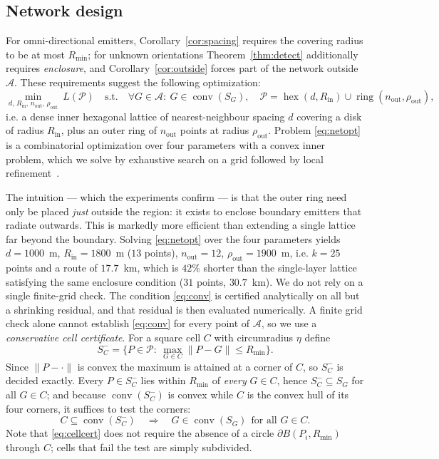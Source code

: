 \documentclass[journal,10pt]{IEEEtran}
\theoremstyle{definition}
\newcommand{\conv}{\operatorname{conv}}
\newcommand{\Rmin}{R_{\min}}
\newcommand{\bA}{\mathcal{A}}
\newcommand{\bP}{\mathcal{P}}
\begin{document}
\subsection{Network design}
\label{sec:network}

For omni-directional emitters, Corollary~\ref{cor:spacing} requires the covering radius to be at
most $\Rmin$; for unknown orientations Theorem~\ref{thm:detect} additionally requires
\emph{enclosure}, and Corollary~\ref{cor:outside} forces part of the network outside $\bA$. These
requirements suggest the following optimization:
\begin{equation}
\min_{d,\,R_{\mathrm{in}},\,n_{\mathrm{out}},\,\rho_{\mathrm{out}}}\ L(\bP)
\quad\text{s.t.}\quad \forall G\in\bA:\ G\in\conv(S_G),
\quad
\bP=\operatorname{hex}(d,R_{\mathrm{in}})\cup\operatorname{ring}(n_{\mathrm{out}},\rho_{\mathrm{out}}),
\label{eq:netopt}
\end{equation}
i.e. a dense inner hexagonal lattice of nearest-neighbour spacing $d$ covering a disk of radius
$R_{\mathrm{in}}$, plus an outer ring of $n_{\mathrm{out}}$ points at radius
$\rho_{\mathrm{out}}$. Problem \eqref{eq:netopt} is a combinatorial optimization over four
parameters with a convex inner problem, which we solve by exhaustive search on a grid followed by
local refinement~\cite{boyd2004}.

The intuition --- which the experiments confirm --- is that the outer ring need only be placed
\emph{just} outside the region: it exists to enclose boundary emitters that radiate outwards. This
is markedly more efficient than extending a single lattice far beyond the boundary. Solving
\eqref{eq:netopt} over the four parameters yields
$d=1000$~m, $R_{\mathrm{in}}=1800$~m ($13$ points), $n_{\mathrm{out}}=12$,
$\rho_{\mathrm{out}}=1900$~m, i.e. $k=25$ points and a route of $17.7$~km, which is $42\%$ shorter
than the single-layer lattice satisfying the same enclosure condition ($31$ points, $30.7$~km). We do
not rely on a single finite-grid check. The condition \eqref{eq:conv} is certified analytically on
all but a shrinking residual, and that residual is then evaluated numerically. A finite grid check
alone cannot establish \eqref{eq:conv} for every point of $\bA$, so we use a \emph{conservative
cell certificate}. For a square cell $C$ with circumradius $\eta$ define
\begin{equation}
S_C^-=\{P\in\bP:\ \textstyle\max_{G\in C}\|P-G\|\le\Rmin\}.
\label{eq:Sminus}
\end{equation}
Since $\|P-\cdot\|$ is convex the maximum is attained at a corner of $C$, so $S_C^-$ is decided
exactly. Every $P\in S_C^-$ lies within $\Rmin$ of \emph{every} $G\in C$, hence
$S_C^-\subseteq S_G$ for all $G\in C$; and because $\conv(S_C^-)$ is convex while $C$ is the
convex hull of its four corners, it suffices to test the corners:
\begin{equation}
C\subseteq\conv(S_C^-)\quad\Longrightarrow\quad G\in\conv(S_G)\ \ \text{for all }G\in C.
\label{eq:cellcert}
\end{equation}
Note that \eqref{eq:cellcert} does not require the absence of a circle
$\partial B(P_i,\Rmin)$ through $C$; cells that fail the test are simply subdivided.
\end{document}
